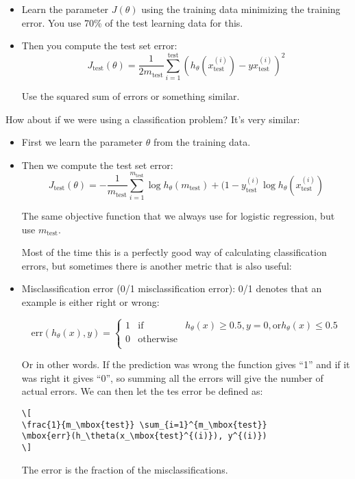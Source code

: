 \documentclass[a4, 12pt, english, USenglish]{scrreprt}
\newcommand{\parens}[1]{\ensuremath{\left({#1}\right)}}
\begin{document}
\begin{itemize}
\item Learn the parameter \(J(\theta)\) using the training data
  minimizing the training error.  You use 70\% of the test learning
  data for this.
\item Then you compute the test set error: \[
   J_{\mbox{test}}(\theta) = \frac{1}{2 m_{\mbox{test}}}
   \sum_{i=1}^{\mbox{test}} \parens{h_\theta(x^{(i)}_{\mbox{test}})- y x^{(i)}_{\mbox{test}}}^2
\]

Use the squared sum of errors or something similar.
\end{itemize}

How about if we were using a classification problem? It's very
similar:

\begin{itemize}

\item First we learn the parameter \(\theta\) from the training data.
\item Then we compute the test set error: \[
   J_{\mbox{test}}(\theta) = - \frac{1}{m_{\mbox{test}}}
   \sum_{i=1}^{m_{\mbox{test}}}
   \log h_\theta(m_{\mbox{test}}) + 
   (1 - y_{\mbox{test}}^{(i)} \log h_\theta(x_{\mbox{test}}^{(i)})
\]

The same objective function that we always use for logistic
regression, but use \(m_{\mbox{test}}\). 

Most of the time this is a perfectly good way of calculating
classification errors, but sometimes there is another metric that is
also useful:

\item Misclassification error (0/1 misclassification error):  0/1
  denotes that an example is either right or wrong:

\[
\mbox{err}(h_\theta(x),y) =
 \left\{
\begin{array}{lll}
1  & \mbox{if}& h_\theta(x) \geq 0.5, y = 0, \mbox{or} h_\theta(x) \le 0.5 \\
0 & \mbox{otherwise}&\\
\end{array}
\right.
\]

Or in other words.  If the prediction was wrong the function gives
``1'' and if it was right it gives ``0'', so summing all the errors
will give the number of actual errors.   We can then let the tes
error be defined as:  

\begin{verbatim}
\[
\frac{1}{m_\mbox{test}} \sum_{i=1}^{m_\mbox{test}}
\mbox{err}(h_\theta(x_\mbox{test}^{(i)}), y^{(i)})
\]
\end{verbatim}

The error is the fraction of the misclassifications.

\end{itemize}
\end{document}
